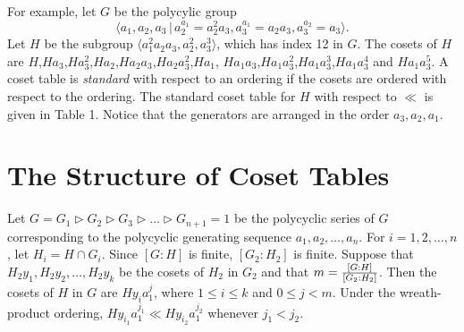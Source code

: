 \documentclass[12 pt]{article}
\begin{document}
For example, let $G$ be the polycylic group
$$\langle a_1,a_2,a_3\,|\,a_2^{a_1}=a_2^2a_3, a_3^{a_1}=a_2a_3,a_3^{a_2}=a_3
  \rangle.$$
Let $H$ be the subgroup $\langle a_1^2a_2a_3,a_2^2,a_3^3\rangle$, which
has index 12 in $G$.
The cosets of $H$ are $H$,$Ha_3$,$Ha_3^2$,$Ha_2$,$Ha_2a_3$,$Ha_2a_3^2$,$Ha_1$,
$Ha_1a_3$,$Ha_1a_3^2$,$Ha_1a_3^3$,$Ha_1a_3^4$ and $Ha_1a_3^5$.
A coset table is {\it standard} with respect to an ordering
if the cosets are ordered with respect
to the ordering.
The standard coset
table for $H$ with respect to $\ll$ is given in Table 1. Notice that the
generators are arranged in the order $a_3,a_2,a_1$.

\section{The Structure of Coset Tables}

Let $G = G_1\triangleright G_2\triangleright G_3\triangleright\ldots
\triangleright G_{n+1} = 1$ be the polycyclic series of $G$ corresponding
to the polycyclic generating sequence $a_1,a_2,\ldots,a_n$.
For $i = 1,2,\ldots,n$, let $H_i=H\cap G_i$. Since $[G:H]$ is finite,
$[G_2:H_2]$ is finite. Suppose that $H_2y_1,H_2y_2,\ldots,H_2y_k$ be the
cosets of $H_2$ in $G_2$ and that $m = {[G:H]\over[G_2:H_2]}$. Then
the cosets of $H$ in $G$ are $Hy_ia_1^j$, where $1\le i\le k$ and
$0\le j< m$. Under the wreath-product ordering, $Hy_{i_1}a_1^{j_1}\ll
Hy_{i_2}a_1^{j_2}$ whenever $j_1<j_2$.
\end{document}
